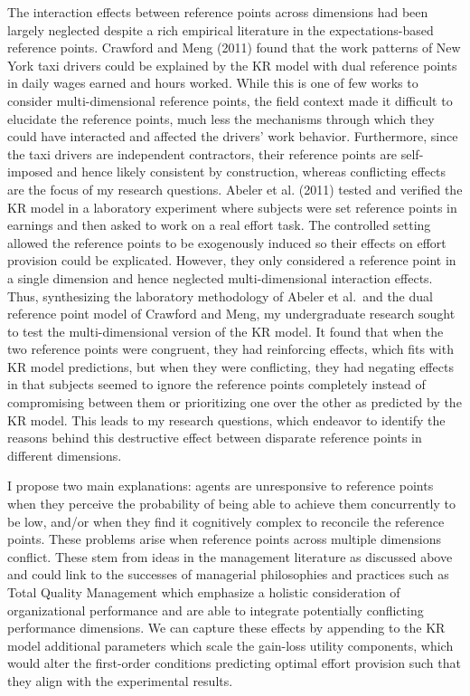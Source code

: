 \documentclass[
  12,
  letterpaper,
  DIV=11,
  numbers=noendperiod]{scrartcl}
\begin{document}
The interaction effects between reference points across dimensions had
been largely neglected despite a rich empirical literature in the
expectations-based reference points. Crawford and Meng (2011) found that
the work patterns of New York taxi drivers could be explained by the KR
model with dual reference points in daily wages earned and hours worked.
While this is one of few works to consider multi-dimensional reference
points, the field context made it difficult to elucidate the reference
points, much less the mechanisms through which they could have
interacted and affected the drivers' work behavior. Furthermore, since
the taxi drivers are independent contractors, their reference points are
self-imposed and hence likely consistent by construction, whereas
conflicting effects are the focus of my research questions. Abeler et
al. (2011) tested and verified the KR model in a laboratory experiment
where subjects were set reference points in earnings and then asked to
work on a real effort task. The controlled setting allowed the reference
points to be exogenously induced so their effects on effort provision
could be explicated. However, they only considered a reference point in
a single dimension and hence neglected multi-dimensional interaction
effects. Thus, synthesizing the laboratory methodology of Abeler et
al.~and the dual reference point model of Crawford and Meng, my
undergraduate research sought to test the multi-dimensional version of
the KR model. It found that when the two reference points were
congruent, they had reinforcing effects, which fits with KR model
predictions, but when they were conflicting, they had negating effects
in that subjects seemed to ignore the reference points completely
instead of compromising between them or prioritizing one over the other
as predicted by the KR model. This leads to my research questions, which
endeavor to identify the reasons behind this destructive effect between
disparate reference points in different dimensions.

I propose two main explanations: agents are unresponsive to reference
points when they perceive the probability of being able to achieve them
concurrently to be low, and/or when they find it cognitively complex to
reconcile the reference points. These problems arise when reference
points across multiple dimensions conflict. These stem from ideas in the
management literature as discussed above and could link to the successes
of managerial philosophies and practices such as Total Quality
Management which emphasize a holistic consideration of organizational
performance and are able to integrate potentially conflicting
performance dimensions. We can capture these effects by appending to the
KR model additional parameters which scale the gain-loss utility
components, which would alter the first-order conditions predicting
optimal effort provision such that they align with the experimental
results.
\end{document}
